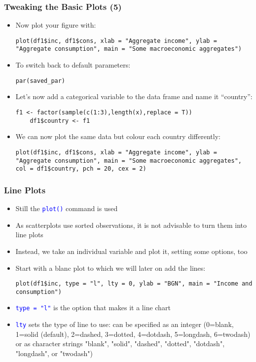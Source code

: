 \documentclass[10pt]{beamer}
\newcommand{\cc}[1]{\texttt{\textcolor{blue}{#1}}}
\theoremstyle{definition}
\begin{document}
\begin{frame}[fragile]
\frametitle{Tweaking the Basic Plots (5)}
\begin{itemize}
	\item Now plot your figure with:
	\begin{lstlisting}[style = rstyle, breaklines]
	plot(df1$inc, df1$cons, xlab = "Aggregate income", ylab = "Aggregate consumption", main = "Some macroeconomic aggregates")
	\end{lstlisting}
	\item To switch back to default parameters:
	\begin{lstlisting}[style = rstyle, breaklines]
	par(saved_par)
	\end{lstlisting}
	\item Let's now add a categorical variable to the data frame and name it ``country'':
	\begin{lstlisting}[style = rstyle, breaklines]
	f1 <- factor(sample(c(1:3),length(x),replace = T))
	df1$country <- f1
	\end{lstlisting}
	\item We can now plot the same data but colour each country differently:
	\begin{lstlisting}[style = rstyle, breaklines]
	plot(df1$inc, df1$cons, xlab = "Aggregate income", ylab = "Aggregate consumption", main = "Some macroeconomic aggregates", col = df1$country, pch = 20, cex = 2)
	\end{lstlisting}
\end{itemize}
\end{frame}

\begin{frame}[fragile]
\frametitle{Line Plots}
\begin{itemize}
	\item Still the \cc{plot()} command is used
	\item As scatterplots use sorted observations, it is not advisable to turn them into line plots
	\item Instead, we take an individual variable and plot it, setting some options, too
	\item Start with a blanc plot to which we will later on add the lines:
	\begin{lstlisting}[style = rstyle, breaklines]
	plot(df1$inc, type = "l", lty = 0, ylab = "BGN", main = "Income and consumption")
	\end{lstlisting}
	\item \cc{type = "l"} is the option that makes it a line chart
	\item \cc{lty} sets the type of line to use: can be specified as an integer (0=blank, 1=solid (default), 2=dashed, 3=dotted, 4=dotdash, 5=longdash, 6=twodash) or as character strings "blank", "solid", "dashed", "dotted", "dotdash", "longdash", or "twodash")
\end{itemize}
\end{frame}
\end{document}
